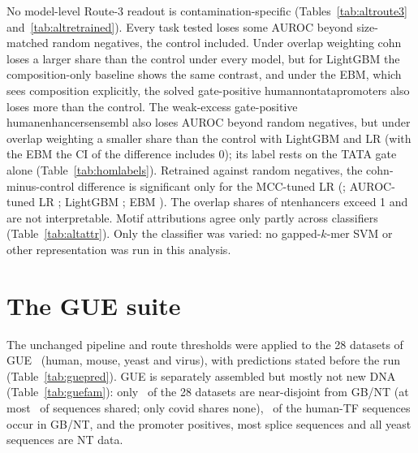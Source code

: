 \documentclass[journal,onecolumn,10pt,letterpaper]{IEEEtran}
\newcommand{\tasku}{\textunderscore\allowbreak}
\DeclareRobustCommand{\task}[1]{{\normalfont\ttfamily\upshape\let\_\tasku #1}}
\begin{document}
No model-level Route-3 readout is contamination-specific (Tables~\ref{tab:altroute3}
and~\ref{tab:altretrained}). Every task tested loses some AUROC beyond size-matched random negatives,
the control included. Under overlap weighting \task{cohn} loses a larger share than the control under
every model, but for LightGBM the composition-only baseline shows the same contrast, and under the EBM,
which sees composition explicitly, the solved gate-positive \task{human\_nontata\_promoters} also loses
more than the control. The weak-excess gate-positive \task{human\_enhancers\_ensembl} also loses AUROC
beyond random negatives, but under overlap weighting a smaller share than the control with LightGBM and
LR (with the EBM the CI of the difference includes 0); its label rests on the TATA gate alone (Table~\ref{tab:homlabels}). Retrained against random negatives, the \task{cohn}-minus-control difference is
significant only for the MCC-tuned LR (\smRetrR; AUROC-tuned LR \smRetrA; LightGBM \smRetrL; EBM
\smRetrE). The overlap shares of \task{nt\_enhancers} exceed 1 and are not interpretable. Motif
attributions agree only partly across classifiers (Table~\ref{tab:altattr}). Only the classifier was
varied: no gapped-$k$-mer SVM or other representation was run in this analysis.








\section{The GUE suite}\label{sec:s8}

The unchanged pipeline and route thresholds were applied to the 28 datasets of GUE~\cite{dnabert2}
(human, mouse, yeast and virus), with predictions stated before the run (Table~\ref{tab:guepred}). GUE
is separately assembled but mostly not new DNA (Table~\ref{tab:guefam}): only \smGueNear\ of the 28
datasets are near-disjoint from GB/NT (at most \smNearMax\ of sequences shared; only covid shares none),
\smGueHumanTF\ of the human-TF sequences occur in GB/NT, and the promoter positives, most splice
sequences and all yeast sequences are NT data.
\end{document}
